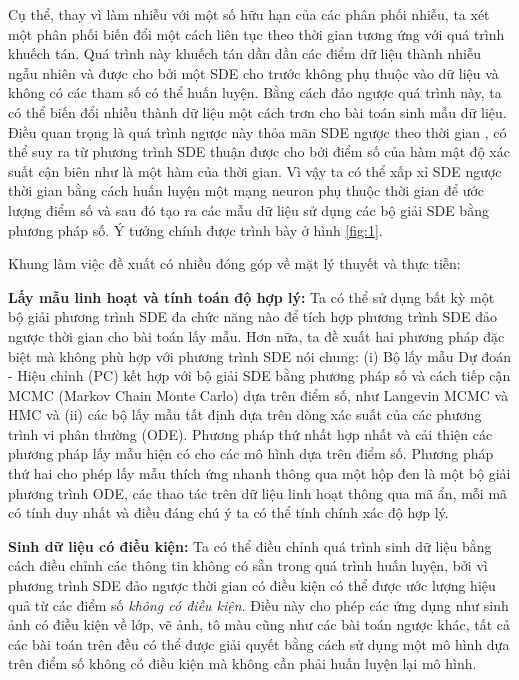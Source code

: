 \documentclass{article} %
\begin{document}
Cụ thể, thay vì làm nhiễu với một số hữu hạn của các phân phối nhiễu, ta xét một phân phối biến đổi một cách liên tục theo thời gian tương ứng với quá trình khuếch tán.
Quá trình này khuếch tán dần dần các điểm dữ liệu thành nhiễu ngẫu nhiên và được cho bởi một SDE cho trước không phụ thuộc vào dữ liệu và không có các tham số có thể huấn luyện.
Bằng cách đảo ngược quá trình này, ta có thể biến đổi nhiễu thành dữ liệu một cách trơn cho bài toán sinh mẫu dữ liệu.
Điều quan trọng là quá trình ngược này thỏa mãn SDE ngược theo thời gian \citep{anderson1982reverse}, có thể suy ra từ phương trình SDE thuận được cho bởi điểm số của hàm mật độ xác suất cận biên như là một hàm của thời gian.
Vì vậy ta có thể xấp xỉ SDE ngược thời gian bằng cách huấn luyện một mạng neuron phụ thuộc thời gian để ước lượng điểm số và sau đó tạo ra các mẫu dữ liệu sử dụng các bộ giải SDE bằng phương pháp số.
Ý tưởng chính được trình bày ở hình \ref{fig:1}.

Khung làm việc đề xuất có nhiều đóng góp về mặt lý thuyết và thực tiễn:

\textbf{Lấy mẫu linh hoạt và tính toán độ hợp lý:} Ta có thể sử dụng bất kỳ một bộ giải phương trình SDE đa chức năng nào để tích hợp phương trình SDE đảo ngược thời gian cho bài toán lấy mẫu.
Hơn nữa, ta đề xuất hai phương pháp đặc biệt mà không phù hợp với phương trình SDE nói chung: (i) Bộ lấy mẫu Dự đoán - Hiệu chỉnh (PC) kết hợp với bộ giải SDE bằng phương pháp số và cách tiếp cận MCMC (Markov Chain Monte Carlo) dựa trên điểm số, như Langevin MCMC \citep{parisi1981correlation} và HMC \citep{neal2011mcmc} và (ii) các bộ lấy mẫu tất định dựa trên dòng xác suất của các phương trình vi phân thường (ODE).
Phương pháp thứ nhất hợp nhất và cải thiện các phương pháp lấy mẫu hiện có cho các mô hình dựa trên điểm số.
Phương pháp thứ hai cho phép lấy mẫu thích ứng nhanh thông qua một hộp đen là một bộ giải phương trình ODE, các thao tác trên dữ liệu linh hoạt thông qua mã ẩn, mỗi mã có tính duy nhất và điều đáng chú ý ta có thể tính chính xác độ hợp lý.

\textbf{Sinh dữ liệu có điều kiện:} Ta có thể điều chỉnh quá trình sinh dữ liệu bằng cách điều chỉnh các thông tin không có sẵn trong quá trình huấn luyện, bởi vì phương trình SDE đảo ngược thời gian có điều kiện có thể được ước lượng hiệu quả từ các điểm số \textit{không có điều kiện}.
Điều này cho phép các ứng dụng như sinh ảnh có điều kiện về lớp, vẽ ảnh, tô màu cũng như các bài toán ngược khác, tất cả các bài toán trên đều có thể được giải quyết bằng cách sử dụng một mô hình dựa trên điểm số không có điều kiện mà không cần phải huấn luyện lại mô hình.
\end{document}
